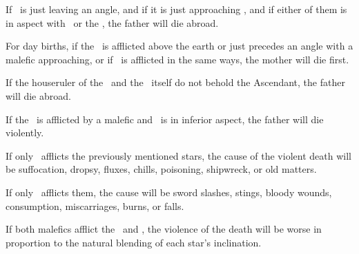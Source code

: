 If \Saturn\, is just leaving an angle, and if it is just approaching \Mars, and if either of them is in aspect with \Jupiter\, or the \Sun, the father will die abroad.

For day births, if the \Moon\, is afflicted above the earth or just precedes an angle with a malefic approaching, or if \Venus\, is afflicted in the same ways, the mother will die first. 

If the houseruler of the \Sun\, and the \Sun\, itself do not behold the Ascendant, the father will die abroad. 

If the \Sun\, is afflicted by a malefic and \Jupiter\, is in inferior aspect, the father will die violently. 

If only \Saturn\, afflicts the previously mentioned stars, the cause of the violent death will be suffocation, dropsy, fluxes, chills, poisoning, shipwreck, or old matters. 

If only \Mars\, afflicts them, the cause will be sword slashes, stings, bloody wounds, consumption, miscarriages, burns, or falls. 

If both malefics afflict the \Sun\, and \Jupiter, the violence of the death will be worse in proportion to the natural blending of each star’s inclination.

\newpage